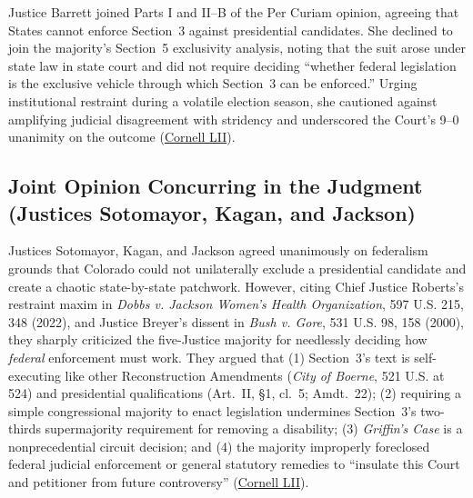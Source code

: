 \documentclass[12pt]{article}
\begin{document}
Justice Barrett joined Parts I and II--B of the Per Curiam opinion, agreeing that States cannot enforce Section~3 against presidential candidates. She declined to join the majority's Section~5 exclusivity analysis, noting that the suit arose under state law in state court and did not require deciding ``whether federal legislation is the exclusive vehicle through which Section~3 can be enforced.'' Urging institutional restraint during a volatile election season, she cautioned against amplifying judicial disagreement with stridency and underscored the Court's 9--0 unanimity on the outcome (\href{https://www.law.cornell.edu/supremecourt/text/23-719}{Cornell LII}).

\subsection{Joint Opinion Concurring in the Judgment (Justices Sotomayor, Kagan, and Jackson)}

Justices Sotomayor, Kagan, and Jackson agreed unanimously on federalism grounds that Colorado could not unilaterally exclude a presidential candidate and create a chaotic state-by-state patchwork. However, citing Chief Justice Roberts's restraint maxim in \emph{Dobbs v. Jackson Women's Health Organization}, 597 U.S. 215, 348 (2022), and Justice Breyer's dissent in \emph{Bush v. Gore}, 531 U.S. 98, 158 (2000), they sharply criticized the five-Justice majority for needlessly deciding how \emph{federal} enforcement must work. They argued that (1) Section~3's text is self-executing like other Reconstruction Amendments (\emph{City of Boerne}, 521 U.S. at 524) and presidential qualifications (Art.\ II, \S 1, cl.\ 5; Amdt.\ 22); (2) requiring a simple congressional majority to enact legislation undermines Section~3's two-thirds supermajority requirement for removing a disability; (3) \emph{Griffin's Case} is a nonprecedential circuit decision; and (4) the majority improperly foreclosed federal judicial enforcement or general statutory remedies to ``insulate this Court and petitioner from future controversy'' (\href{https://www.law.cornell.edu/supremecourt/text/23-719}{Cornell LII}).
\end{document}
